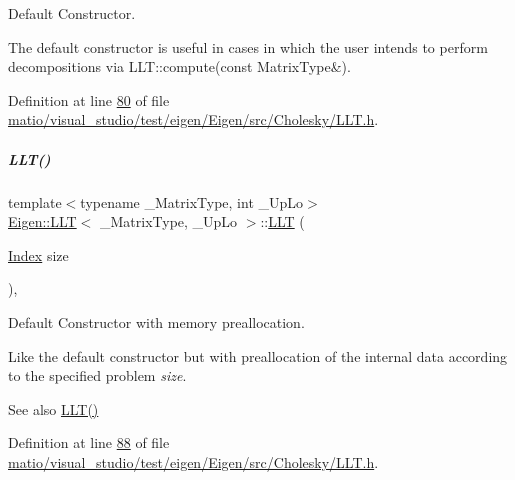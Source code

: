 Default Constructor. 

The default constructor is useful in cases in which the user intends to perform decompositions via L\+L\+T\+::compute(const Matrix\+Type\&). 

Definition at line \hyperlink{matio_2visual__studio_2test_2eigen_2_eigen_2src_2_cholesky_2_l_l_t_8h_source_l00080}{80} of file \hyperlink{matio_2visual__studio_2test_2eigen_2_eigen_2src_2_cholesky_2_l_l_t_8h_source}{matio/visual\+\_\+studio/test/eigen/\+Eigen/src/\+Cholesky/\+L\+L\+T.\+h}.

\mbox{\label{group___cholesky___module_ab3656cfbdf38e03c57d5cf79bf8131b6}} 
\subparagraph{\texorpdfstring{L\+L\+T()}{LLT()}\hspace{0.1cm}{\footnotesize\ttfamily [5/6]}}
{\footnotesize\ttfamily template$<$typename \+\_\+\+Matrix\+Type, int \+\_\+\+Up\+Lo$>$ \\
\hyperlink{group___cholesky___module_class_eigen_1_1_l_l_t}{Eigen\+::\+L\+LT}$<$ \+\_\+\+Matrix\+Type, \+\_\+\+Up\+Lo $>$\+::\hyperlink{group___cholesky___module_class_eigen_1_1_l_l_t}{L\+LT} (\begin{DoxyParamCaption}\item[{\hyperlink{group___cholesky___module_ac7a64274814fa76e8b1e9e945546037f}{Index}}]{size }\end{DoxyParamCaption})\hspace{0.3cm}{\ttfamily [inline]}, {\ttfamily [explicit]}}



Default Constructor with memory preallocation. 

Like the default constructor but with preallocation of the internal data according to the specified problem {\itshape size}. \begin{DoxySeeAlso}{See also}
\hyperlink{group___cholesky___module_a16d1ec9ea6497ba1febb242c2e8a7a96}{L\+L\+T()} 
\end{DoxySeeAlso}


Definition at line \hyperlink{matio_2visual__studio_2test_2eigen_2_eigen_2src_2_cholesky_2_l_l_t_8h_source_l00088}{88} of file \hyperlink{matio_2visual__studio_2test_2eigen_2_eigen_2src_2_cholesky_2_l_l_t_8h_source}{matio/visual\+\_\+studio/test/eigen/\+Eigen/src/\+Cholesky/\+L\+L\+T.\+h}.

